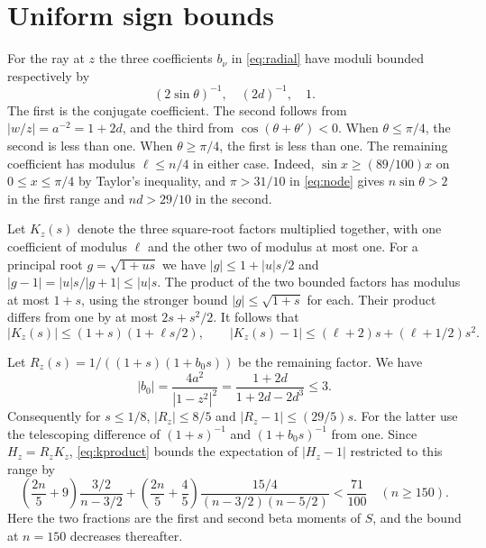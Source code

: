 \documentclass[11pt]{article}
\begin{document}
\section{Uniform sign bounds}
For the ray at $z$ the three coefficients $b_\nu$ in \eqref{eq:radial} have moduli bounded respectively by
\[
(2\sin\theta)^{-1},\quad (2d)^{-1},\quad 1.
\]
The first is the conjugate coefficient. The second follows from $|w/z|=a^{-2}=1+2d$, and the third from $\cos(\theta+\theta')<0$. When $\theta\le\pi/4$, the second is less than one. When $\theta\ge\pi/4$, the first is less than one. The remaining coefficient has modulus $\ell\le n/4$ in either case. Indeed, $\sin x\ge(89/100)x$ on $0\le x\le\pi/4$ by Taylor's inequality, and $\pi>31/10$ in \eqref{eq:node} gives $n\sin\theta>2$ in the first range and $nd>29/10$ in the second.

Let $K_z(s)$ denote the three square-root factors multiplied together, with one coefficient of modulus $\ell$ and the other two of modulus at most one. For a principal root $g=\sqrt{1+us}$ we have $|g|\le1+|u|s/2$ and $|g-1|=|u|s/|g+1|\le|u|s$. The product of the two bounded factors has modulus at most $1+s$, using the stronger bound $|g|\le\sqrt{1+s}$ for each. Their product differs from one by at most $2s+s^2/2$. It follows that
\begin{equation}
|K_z(s)|\le(1+s)(1+\ell s/2),\qquad
|K_z(s)-1|\le(\ell+2)s+(\ell+1/2)s^2 .
\label{eq:kproduct}
\end{equation}

Let $R_z(s)=1/((1+s)(1+b_0s))$ be the remaining factor. We have
\[
|b_0|=\frac{4a^2}{|1-z^2|^2}
     =\frac{1+2d}{1+2d-2d^3}\le3 .
\]
Consequently for $s\le1/8$, $|R_z|\le8/5$ and $|R_z-1|\le(29/5)s$. For the latter use the telescoping difference of $(1+s)^{-1}$ and $(1+b_0s)^{-1}$ from one. Since $H_z=R_z K_z$, \eqref{eq:kproduct} bounds the expectation of $|H_z-1|$ restricted to this range by
\begin{equation}
\left(\frac{2n}{5}+9\right)\frac{3/2}{n-3/2}
+\left(\frac{2n}{5}+\frac45\right)
  \frac{15/4}{(n-3/2)(n-5/2)}
<\frac{71}{100}\quad(n\ge150).
\label{eq:local}
\end{equation}
Here the two fractions are the first and second beta moments of $S$, and the bound at $n=150$ decreases thereafter.
\end{document}
